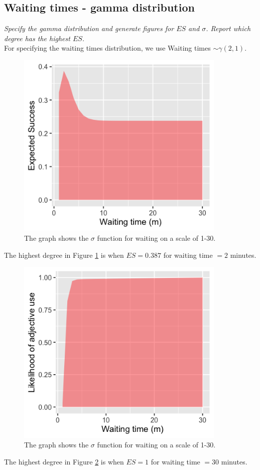 \documentclass[11pt,a4paper,oneside]{article}
\begin{document}
\subsection{Waiting times - gamma distribution}
\textit{Specify the gamma distribution and generate figures for $ES$ and $\sigma$. Report which degree has the highest $ES$.}\\

For specifying the waiting times distribution, we use Waiting times $\sim \mathcal{\gamma}(2, 1)$. 

\begin{figure}[H]
    \centering
    \includegraphics[width=100mm]{figs/Question_2_waiting_time_es.png}
    \caption{The graph shows the $\sigma$ function for waiting on a scale of 1-30.}
  \label{fig:q2_waiting_es}
\end{figure}
The highest degree in Figure \ref{fig:q2_waiting_es} is when $ES = 0.387$ for waiting time $= 2$ minutes.


\begin{figure}[H]
    \centering
    \includegraphics[width=100mm]{figs/Question_2_waiting_time_sigma.png}
    \caption{The graph shows the $\sigma$ function for waiting on a scale of 1-30.}
  \label{fig:q2_waiting_sigma}
\end{figure}
The highest degree in Figure \ref{fig:q2_waiting_sigma} is when $ES = 1$ for waiting time $= 30$ minutes.
\end{document}

